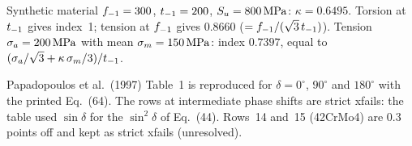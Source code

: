  Synthetic material $f_{-1}=300$, $t_{-1}=200$, $S_u=800\,\mathrm{MPa}$: $\kappa=0.6495$. Torsion
at $t_{-1}$ gives index~1; tension at $f_{-1}$ gives $0.8660$ ($=f_{-1}/(\sqrt3\,t_{-1})$). Tension
$\sigma_a=200\,\mathrm{MPa}$ with mean $\sigma_m=150\,\mathrm{MPa}$: index $0.7397$, equal to
$(\sigma_a/\sqrt3+\kappa\,\sigma_m/3)/t_{-1}$.

 Papadopoulos et al.\ (1997) Table~1 is reproduced for $\delta=0^\circ$,
$90^\circ$ and $180^\circ$ with the printed Eq.~(64). The rows at intermediate phase shifts are
strict xfails: the table used $\sin\delta$ for the $\sin^2\delta$ of Eq.~(44). Rows~14 and~15
(42CrMo4) are 0.3 points off and kept as strict xfails (unresolved).
